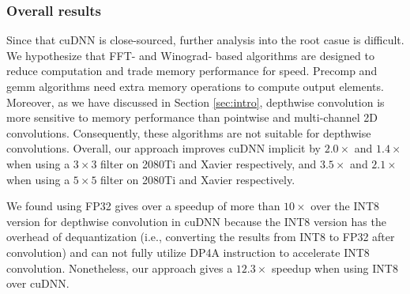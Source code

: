 \subsubsection{Overall results}
 Since that cuDNN is close-sourced, further analysis into the root casue is difficult. We hypothesize that
FFT- and Winograd- based algorithms are designed to reduce computation and trade memory performance for speed. Precomp and gemm algorithms
need extra memory operations to compute output elements. Moreover, as we have discussed in Section \ref{sec:intro}, depthwise convolution
is more sensitive to memory performance than pointwise and multi-channel 2D convolutions. Consequently, these algorithms are not suitable
for depthwise convolutions. Overall, our approach improves cuDNN implicit by $2.0\times$ and $1.4\times$ when using a $3 \times 3$  filter
on 2080Ti and Xavier respectively, and $3.5\times$ and $2.1\times$ when using a $5 \times 5$ filter on 2080Ti and Xavier respectively.

 We found using FP32 gives over a speedup of more than $10\times$ over the INT8 version for depthwise
convolution in cuDNN because the INT8 version has the overhead of dequantization (i.e., converting the results from INT8 to FP32 after convolution) and can not fully utilize DP4A instruction to accelerate INT8 convolution.
Nonetheless, our approach gives a $12.3\times$ speedup when using INT8 over cuDNN.





